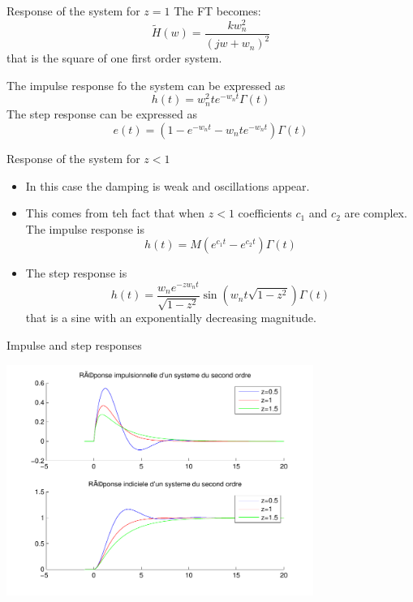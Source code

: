       \begin{block}{Response of the system for $z=1$}
        The FT becomes:
    \begin{equation}
      \label{eq:transfsecondordre3}
      \tilde H(w)=\frac{kw_n^2}{(jw+w_n)^2}
    \end{equation}
    that is the square of one first order system.
    
     The impulse response fo the system can be expressed as
    \begin{equation*}
      h(t)=w_n^2te^{-w_nt}\Gamma(t)
    \end{equation*}
    The step response can be expressed as
    \begin{equation*}
      e(t)=(1-e^{-w_nt}-w_nte^{-w_nt})\Gamma(t)
    \end{equation*}
      \end{block}


      \begin{block}{Response of the system for $z<1$}
        \begin{itemize}
        \item In this case the damping is weak and oscillations appear.
    \item This comes from teh fact that when
     $z<1$ coefficients $c_1$
     and $c_2$ are complex. The impulse response is
    \begin{equation*}
      h(t)=M(e^{c_1t}-e^{c_2t})\Gamma(t)
    \end{equation*}
    \item The step response is
    \begin{equation*}
      h(t)=\frac{w_ne^{-zw_nt}}{\sqrt{1-z^2}}\sin\left(w_nt\sqrt{1-z^2}\right)\Gamma(t)
    \end{equation*}
    that is  a sine with an exponentially decreasing magnitude. 
        \end{itemize}
     
    
    
    
      \end{block}


      \begin{block}{Impulse and step responses}
        \begin{center}
          \includegraphics[width=10cm]{imgs/fourier/rep_2o}
        \end{center}
      \end{block}


